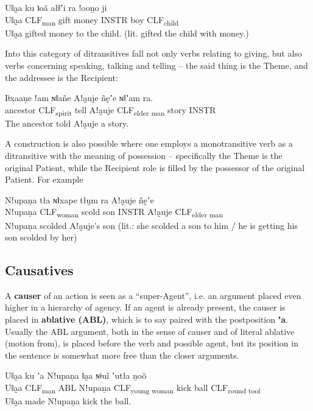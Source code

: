 \documentclass[11pt,a5paper]{book}
\newcommand{\qcn}[1]{\textcolor{AccentText}{\large\textbf{#1}}}
\newcommand{\grammsc}[1]{\textsc{#1}}
\newcommand{\CLF}[1]{\grammsc{CLF}\textsubscript{#1}}
\newcommand{\INSTR}{\grammsc{INSTR}}
\begin{document}
\begin{exe}
\ex
\gll Uǁa̰a ku ʇoã ałǁʼi ra  !ooṉo 	ji\\
Uǁa̰a \CLF{man} gift money INSTR boy \CLF{child}\\
\glt Uǁa̰a gifted money to the child. (lit. gifted the child with money.)
\end{exe}

Into this category of ditransitives fall not only verbs relating to giving, but also verbs concerning speaking, talking and telling -- the said thing is the Theme, and the addressee is the Recipient:

\begin{exe}
\ex
\gll Iǂxaaṇe ǃam ɴǁañe Aǃa̰uje ñḛʼe ɴǁʼam ra.\\
ancestor \CLF{spirit} tell Aǃa̰uje \CLF{elder man} story  \INSTR \\
\glt The ancestor told Aǃa̰uje a story.
\end{exe}

A construction is also possible where one employs a monotransitive verb as a ditransitive with the meaning of possession -- specifically the Theme is the original Patient, while the Recipient role is filled by the possessor of the original Patient. For example

\begin{exe}
	\ex
	\gll Nǃupaṇa 	tła ɴǁxape tłṵm ra  Aǃa̰uje ñḛʼe 	 \\
		Nǃupaṇa 	\CLF{woman} 	scold son \INSTR{} Aǃa̰uje \CLF{elder man}\\
	\glt Nǃupaṇa scolded Aǃa̰uje's son  (lit.: she scolded a son to him / he is getting his son scolded by her)
\end{exe}


\subsection{Causatives}

A \textbf{causer} of an action is seen as a ``super-Agent'', i.e. an argument placed even higher in a hierarchy of agency. If an agent is already present, the causer is placed in \textbf{ablative (ABL)}, which is to say paired with the postposition \qcn{ʼa}. Usually the ABL argument, both in the sense of causer and of literal ablative (motion from), is placed before the verb and possible agent, but its position in the sentence is somewhat more free than the closer arguments.

\begin{exe}
\ex
\gll Uǁa̰a ku ʼa Nǃupaṇa ǁa̰a ɴǂuĩ 	 	ʼutła 	ṉoõ\\
Uǁa̰a \CLF{man} ABL Nǃupaṇa \CLF{young woman} kick ball \CLF{round tool}\\
\glt Uǁa̰a made Nǃupaṇa kick the ball.
\end{exe}
\end{document}
